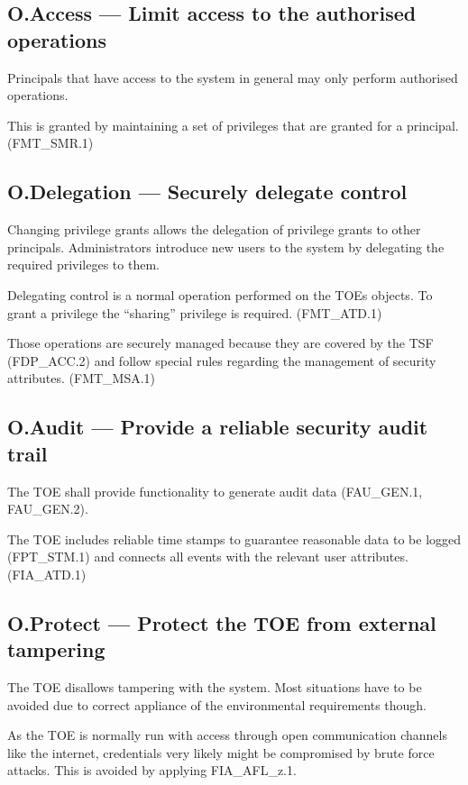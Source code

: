 \documentclass[12pt,english]{scrbook}
\begin{document}
\subsection{O.Access --- Limit access to the authorised operations}

Principals that have access to the system in general may only perform
authorised operations.

This is granted by maintaining a set of privileges that are granted for a
principal. (FMT{\_}SMR.1)

\subsection{O.Delegation  --- Securely delegate control}

    Changing privilege grants allows the delegation of privilege grants to
    other principals. Administrators introduce new users to the system by
    delegating the required privileges to them.

    Delegating control is a normal operation performed on the TOEs objects. To
    grant a privilege the ``sharing'' privilege is required. (FMT\_ATD.1)

    Those operations are securely managed because they are covered by the TSF
    (FDP\_ACC.2) and follow special rules regarding the management of security
    attributes. (FMT\_MSA.1)

\subsection{O.Audit --- Provide a reliable security audit trail}

    The TOE shall provide functionality to generate audit data (FAU\_GEN.1,
    FAU\_GEN.2).

    The TOE includes reliable time stamps to guarantee reasonable data to be
    logged (FPT\_STM.1) and connects all events with the relevant user
    attributes. (FIA\_ATD.1)

\subsection{O.Protect --- Protect the TOE from external tampering}

    The TOE disallows tampering with the system. Most situations have to be
    avoided due to correct appliance of the environmental requirements though.

    As the TOE is normally run with access through open communication channels
    like the internet, credentials very likely might be compromised by brute
    force attacks. This is avoided by applying FIA\_AFL\_z.1.
\end{document}
